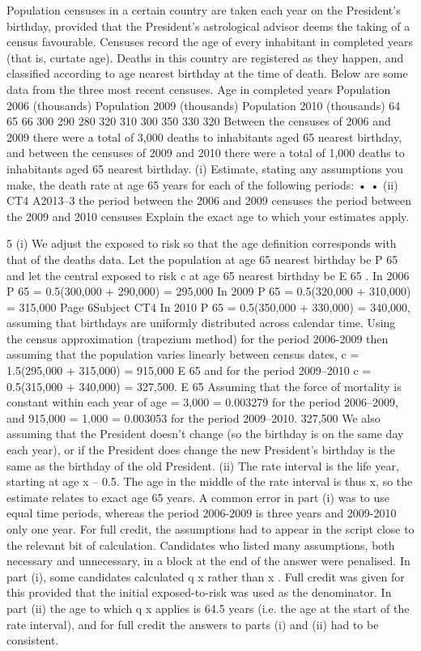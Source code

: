 \documentclass[a4paper,12pt]{article}
\begin{document}
Population censuses in a certain country are taken each year on the President’s
birthday, provided that the President’s astrological advisor deems the taking of a
census favourable. Censuses record the age of every inhabitant in completed years
(that is, curtate age). Deaths in this country are registered as they happen, and
classified according to age nearest birthday at the time of death.
Below are some data from the three most recent censuses.
Age in
completed
years Population
2006
(thousands) Population
2009
(thousands) Population
2010
(thousands)
64
65
66 300
290
280 320
310
300 350
330
320
Between the censuses of 2006 and 2009 there were a total of 3,000 deaths to
inhabitants aged 65 nearest birthday, and between the censuses of 2009 and 2010
there were a total of 1,000 deaths to inhabitants aged 65 nearest birthday.
(i)
Estimate, stating any assumptions you make, the death rate at age 65 years for
each of the following periods:
•
•
(ii)
CT4 A2013–3
the period between the 2006 and 2009 censuses
the period between the 2009 and 2010 censuses
Explain the exact age to which your estimates apply.




5
(i)
We adjust the exposed to risk so that the age definition corresponds with that of the
deaths data.
Let the population at age 65 nearest birthday be P 65 and let the central exposed to risk
c
at age 65 nearest birthday be E 65
.
In 2006 P 65 = 0.5(300,000 + 290,000) = 295,000
In 2009 P 65 = 0.5(320,000 + 310,000) = 315,000
Page 6Subject CT4 %
In 2010 P 65 = 0.5(350,000 + 330,000) = 340,000,
assuming that birthdays are uniformly distributed across calendar time.
Using the census approximation (trapezium method) for the period 2006-2009 then
assuming that the population varies linearly between census dates,
c
= 1.5(295,000 + 315,000) = 915,000
E 65
and for the period 2009–2010
c
= 0.5(315,000 + 340,000) = 327,500.
E 65
Assuming that the force of mortality is constant within each year of age
 = 3,000
= 0.003279 for the period 2006–2009, and
915,000
 = 1,000
= 0.003053 for the period 2009–2010.
327,500
We also assuming that the President doesn't change (so the birthday is on the same
day each year), or if the President does change the new President’s birthday is the
same as the birthday of the old President.
(ii)
The rate interval is the life year, starting at age x – 0.5.
The age in the middle of the rate interval is thus x, so the estimate relates
to exact age 65 years.
A common error in part (i) was to use equal time periods, whereas the period 2006-2009 is three years and 2009-2010 only one year. For full credit, the assumptions had to appear in
the script close to the relevant bit of calculation. Candidates who listed many assumptions, both necessary and unnecessary, in a block at the end of the answer were penalised. In part
(i), some candidates calculated q x rather than \mu x . Full credit was given for this provided that the initial exposed-to-risk was used as the denominator. In part (ii) the age to which q x
applies is 64.5 years (i.e. the age at the start of the rate interval), and for full credit the answers to parts (i) and (ii) had to be consistent.
\end{document}
